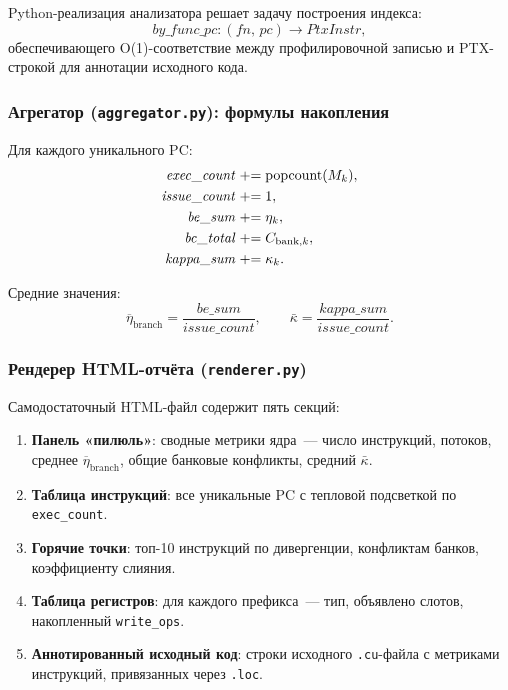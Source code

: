 Python-реализация анализатора решает задачу построения индекса:
\begin{equation}
  \mathit{by\_func\_pc} : (\mathit{fn},\, \mathit{pc})
  \to \mathit{PtxInstr},
\end{equation}
обеспечивающего O(1)-соответствие между профилировочной записью
и PTX-строкой для аннотации исходного кода.

\subsubsection{Агрегатор (\texttt{aggregator.py}): формулы накопления}

Для каждого уникального PC:
\begin{align}
  \mathit{exec\_count} &\mathrel{+}= \mathrm{popcount}(M_k), \\
  \mathit{issue\_count} &\mathrel{+}= 1, \\
  \mathit{be\_sum} &\mathrel{+}= \eta_k, \\
  \mathit{bc\_total} &\mathrel{+}= C_{\mathrm{bank},k}, \\
  \mathit{kappa\_sum} &\mathrel{+}= \kappa_k.
\end{align}

Средние значения:
\begin{equation}
  \overline{\eta}_{\mathrm{branch}} = \frac{\mathit{be\_sum}}{\mathit{issue\_count}},
  \qquad
  \bar{\kappa} = \frac{\mathit{kappa\_sum}}{\mathit{issue\_count}}.
\end{equation}

\subsubsection{Рендерер HTML-отчёта (\texttt{renderer.py})}

Самодостаточный HTML-файл содержит пять секций:

\begin{enumerate}
  \item \textbf{Панель «пилюль»}: сводные метрики ядра~---
        число инструкций, потоков, среднее $\overline{\eta}_{\mathrm{branch}}$,
        общие банковые конфликты, средний $\bar{\kappa}$.
  \item \textbf{Таблица инструкций}: все уникальные PC с тепловой
        подсветкой по \texttt{exec\_count}.
  \item \textbf{Горячие точки}: топ-10 инструкций по дивергенции,
        конфликтам банков, коэффициенту слияния.
  \item \textbf{Таблица регистров}: для каждого префикса~---
        тип, объявлено слотов, накопленный \texttt{write\_ops}.
  \item \textbf{Аннотированный исходный код}: строки исходного
        \texttt{.cu}-файла с метриками инструкций, привязанных
        через \texttt{.loc}.
\end{enumerate}

